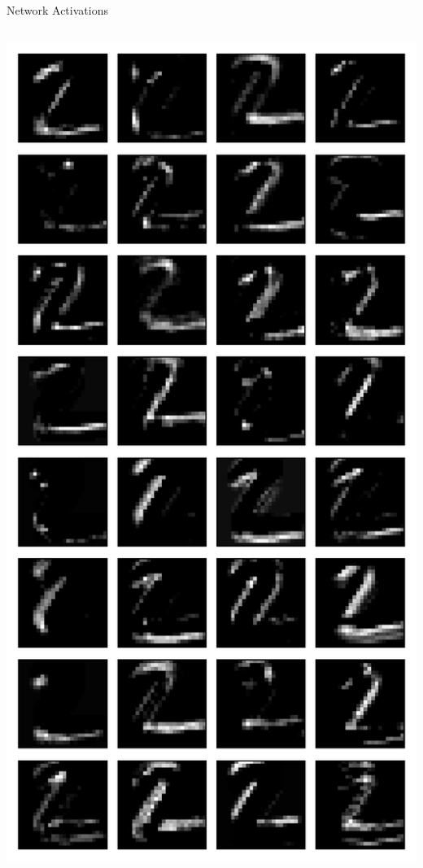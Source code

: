 \documentclass[10pt, aspectratio=169]{beamer} %
\begin{document}
\begin{frame}[fragile]{Network Activations}
\begin{columns}
\includegraphics[width=\textwidth]{keras_l1_outputs_2.pdf}
\end{columns}
\end{frame}
\end{document}
